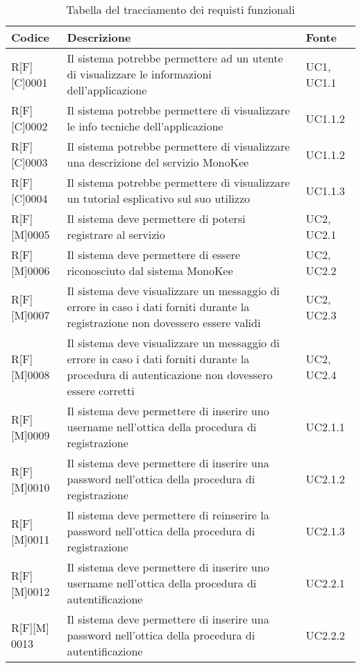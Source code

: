 \newpage
\begin{table}%
\caption{Tabella del tracciamento dei requisti funzionali}
\label{tab:requisiti-funzionali}
\begin{tabularx}{\textwidth}{lXl}
\hline\hline
\textbf{Codice} & \textbf{Descrizione} & \textbf{Fonte}\\
\hline
R[F][C]0001     & Il sistema potrebbe permettere ad un utente di visualizzare le informazioni dell’applicazione & UC1, UC1.1 \\
\hline
R[F][C]0002     & Il sistema potrebbe permettere di visualizzare le info tecniche dell’applicazione & UC1.1.2 \\
\hline
R[F][C]0003     & Il sistema potrebbe permettere di visualizzare una descrizione del servizio MonoKee & UC1.1.2 \\
\hline
R[F][C]0004     & Il sistema potrebbe permettere di visualizzare un tutorial esplicativo sul suo utilizzo & UC1.1.3 \\
\hline
R[F][M]0005     & Il sistema deve permettere di potersi registrare al servizio & UC2, UC2.1 \\
\hline
R[F][M]0006     & Il sistema deve permettere di essere riconosciuto dal sistema MonoKee & UC2, UC2.2 \\
\hline
R[F][M]0007     & Il sistema deve visualizzare un messaggio di errore in caso i dati forniti durante la registrazione non dovessero essere validi & UC2, UC2.3 \\
\hline
R[F][M]0008     & Il sistema deve visualizzare un messaggio di errore in caso i dati forniti durante la procedura di autenticazione non dovessero essere corretti & UC2, UC2.4 \\
\hline
R[F][M]0009     & Il sistema deve permettere di inserire uno username nell’ottica della procedura di registrazione  & UC2.1.1\\
\hline
R[F][M]0010    & Il sistema deve permettere di inserire una password nell’ottica della procedura di registrazione & UC2.1.2 \\
\hline
R[F][M]0011     & Il sistema deve permettere di reinserire la password nell’ottica della procedura di registrazione & UC2.1.3 \\
\hline
R[F][M]0012     & Il sistema deve permettere di inserire uno username nell’ottica della procedura di autentificazione & UC2.2.1 \\
\hline
R[F][M] 0013     & Il sistema deve permettere di inserire una password nell’ottica della procedura di autentificazione & UC2.2.2 \\

\end{tabularx}
\end{table}
